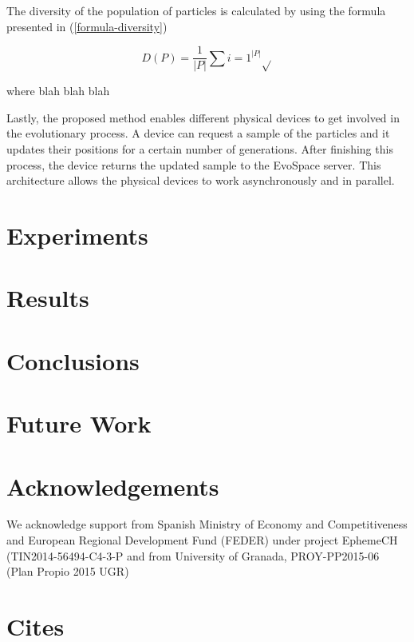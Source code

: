 \documentclass[runningheads,a4paper]{llncs}
\begin{document}
The diversity of the population of particles is calculated by using
the formula presented in (\ref{formula-diversity})

\begin{equation}
  \label{formula-diversity}
  D(P) = \frac{1}{|P|}\sum{i=1}^{|P|} \sqrt{}
\end{equation}

where blah blah blah %

Lastly, the proposed method enables different physical devices to get
involved in the evolutionary process. A device can request a sample of
the particles and it updates their positions for a certain number of
generations. After finishing this process, the device returns the
updated sample to the EvoSpace server. This architecture allows the
physical devices to work asynchronously and in parallel.

\section{Experiments}
\label{experiments}

\section{Results}
\label{results}

\section{Conclusions}
\label{conclusions}

\section{Future Work}
\label{future-work}

\section{Acknowledgements}

We acknowledge support from 
Spanish Ministry of Economy and Competitiveness and European Regional
Development Fund (FEDER) under project EphemeCH
(TIN2014-56494-C4-3-P and  
from University of Granada, PROY-PP2015-06 (Plan Propio 2015 UGR)
\section{Cites}


\cite{garcia2015evospace}
\cite{garcia2014randomized}
\cite{merelo2012pool}
\cite{mussi2011gpu}
\cite{merelo2013designing}
\cite{merelo2008asynchronous}
\cite{morrison2001measurement}
\cite{roy2009distributed}
\cite{sherry2012flex}
\cite{tanabe2013evaluation}
\cite{de1990analysis}
\cite{melin2013optimal}
\cite{zadeh1988fuzzy}
\cite{zadeh1965fuzzy}
\cite{abdelbar2005fuzzy}
\cite{kenndy1995particle}
\cite{mcnabb2007parallel}
\cite{venter2006parallel}
\cite{koh2006parallel}
\cite{cheng2013population}
\cite{gong2011distributed}



\end{document}
